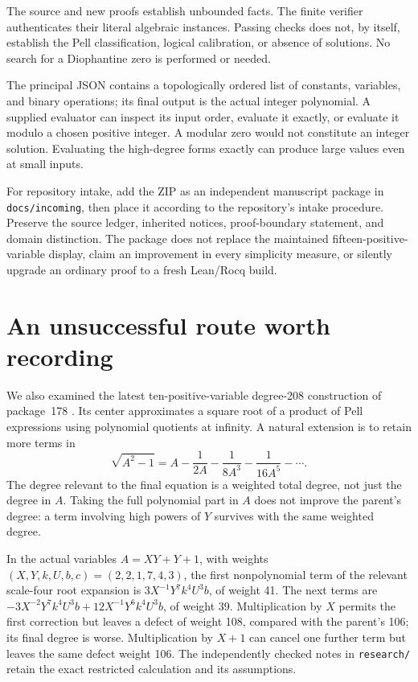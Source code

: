 \documentclass[11pt]{article}
\theoremstyle{definition}\newtheorem{definition}[theorem]{Definition}
\theoremstyle{remark}\newtheorem{remark}[theorem]{Remark}
\begin{document}
The source and new proofs establish unbounded facts. The finite
verifier authenticates their literal algebraic instances. Passing
checks does not, by itself, establish the Pell classification,
logical calibration, or absence of solutions. No search for a
Diophantine zero is performed or needed.

The principal JSON contains a topologically ordered list of constants,
variables, and binary operations; its final output is the actual
integer polynomial. A supplied evaluator can inspect its input order,
evaluate it exactly, or evaluate it modulo a chosen positive integer.
A modular zero would not constitute an integer solution. Evaluating
the high-degree forms exactly can produce large values even at
small inputs.

For repository intake, add the ZIP as an independent manuscript
package in \texttt{docs/incoming}, then place it according to the
repository's intake procedure. Preserve the source ledger, inherited
notices, proof-boundary statement, and domain distinction. The package
does not replace the maintained fifteen-positive-variable display,
claim an improvement in every simplicity measure, or silently
upgrade an ordinary proof to a fresh Lean/Rocq build.

\section{An unsuccessful route worth recording}
\label{sec:obstruction}

We also examined the latest ten-positive-variable degree-208
construction of package~178 \cite{p178}. Its center approximates a square root
of a product of Pell expressions using polynomial quotients at
infinity. A natural extension is to retain more terms in
\[
 \sqrt{A^2-1}=A-\frac1{2A}-\frac1{8A^3}
                    -\frac1{16A^5}-\cdots.
\]
The degree relevant to the final equation is a weighted total degree,
not just the degree in $A$. Taking the full polynomial part in $A$
does not improve the parent's degree: a term involving high powers
of $Y$ survives with the same weighted degree.

In the actual variables $A=XY+Y+1$, with weights
$(X,Y,k,U,b,c)=(2,2,1,7,4,3)$, the first nonpolynomial term of
the relevant scale-four root expansion is
$3X^{-1}Y^7k^4U^3b$, of weight 41. The next terms are
$-3X^{-2}Y^7k^4U^3b+12X^{-1}Y^6k^4U^3b$, of weight 39.
Multiplication by $X$ permits the first correction but leaves a
defect of weight 108, compared with the parent's 106; its final
degree is worse. Multiplication by $X+1$ can cancel one further
term but leaves the same defect weight 106. The independently
checked notes in \texttt{research/} retain the exact restricted
calculation and its assumptions.
\end{document}
